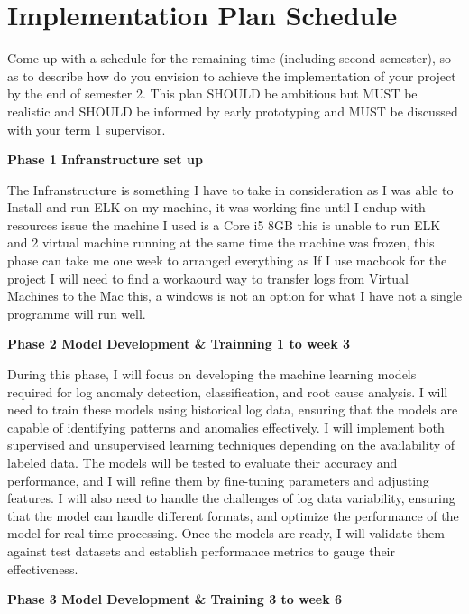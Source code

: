 
\section{Implementation Plan Schedule}
Come up with a schedule for the remaining time (including second semester), so as to describe how do you envision to achieve the implementation of your project by the end of semester 2. This plan SHOULD be ambitious but MUST be realistic and SHOULD be informed by early prototyping and MUST be discussed with your term 1 supervisor.

\textbf{Phase 1 Infranstructure set up}

The Infranstructure is something I have to take in consideration as I was able to Install and run ELK on my machine, it was working fine until I endup with resources issue the machine I used is a Core i5 8GB this is unable to run ELK and 2 virtual machine running at the same time the machine was frozen, this phase can take me one week to arranged everything as If I use macbook for the project I will need to find a workaourd way to transfer logs from Virtual Machines to the Mac this, a windows is not an option for what I have not a single programme will run well.


\textbf{Phase 2 Model Development \& Trainning 1 to week 3 }

During this phase, I will focus on developing the machine learning models required for log anomaly detection, classification, and root cause analysis. I will need to train these models using historical log data, ensuring that the models are capable of identifying patterns and anomalies effectively. I will implement both supervised and unsupervised learning techniques depending on the availability of labeled data. The models will be tested to evaluate their accuracy and performance, and I will refine them by fine-tuning parameters and adjusting features. I will also need to handle the challenges of log data variability, ensuring that the model can handle different formats, and optimize the performance of the model for real-time processing. Once the models are ready, I will validate them against test datasets and establish performance metrics to gauge their effectiveness.


\textbf{Phase 3 Model Development \& Training 3 to week  6}

